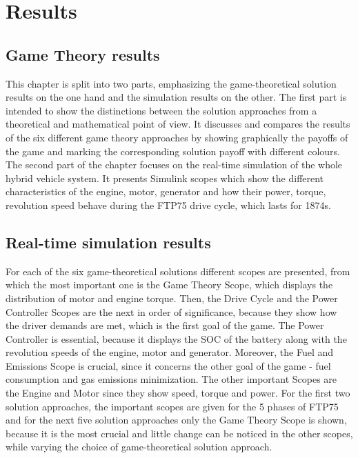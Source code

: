 \chapter{Results}
\label{chp:results}

\section{Game Theory results}
This chapter is split into two parts, emphasizing the game-theoretical solution results on the one hand and the simulation results on the other. The first part is intended to show the distinctions between the solution approaches from a theoretical and mathematical point of view. It discusses and compares the results of the six different game theory approaches by showing graphically the payoffs of the game and marking the corresponding solution payoff with different colours. The second part of the chapter focuses on the real-time simulation of the whole hybrid vehicle system. It presents Simulink scopes which show the different characteristics of the engine, motor, generator and how their power, torque, revolution speed behave during the FTP75 drive cycle, which lasts for 1874s.

\section{Real-time simulation results}

For each of the six game-theoretical solutions different scopes are presented, from which the most important one is the Game Theory Scope, which displays the distribution of motor and engine torque. Then, the Drive Cycle and the Power Controller Scopes are the next in order of significance, because they show how the driver demands are met, which is the first goal of the game. The Power Controller is essential, because it displays the SOC of the battery along with the revolution speeds of the engine, motor and generator. Moreover, the Fuel and Emissions Scope is crucial, since it concerns the other goal of the game - fuel consumption and gas emissions minimization. The other important Scopes are the Engine and Motor since they show speed, torque and power. For the first two solution approaches, the important scopes are given for the 5 phases of FTP75 and for the next five solution approaches only the Game Theory Scope is shown, because it is the most crucial and little change can be noticed in the other scopes, while varying the choice of game-theoretical solution approach.

